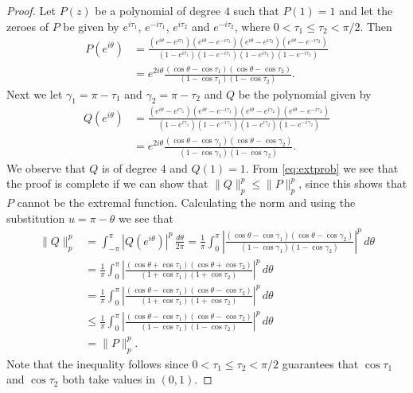 \documentclass{amsart}
\theoremstyle{plain}
\theoremstyle{remark}
\begin{document}
	\begin{proof}
	Let $P(z)$ be a polynomial of degree $4$ such that $P(1)=1$ and let the zeroes of $P$ be given by $e^{i \tau_1}$, $e^{-i \tau_1}$, $e^{i \tau_2}$ and $e^{-i \tau_2}$, where $0<\tau_1 \leq \tau_2 <\pi/2$. Then 
		\[\begin{split}
			P(e^{i \theta})&= \frac{(e^{i \theta}-e^{i \tau_1})(e^{i \theta}-e^{-i \tau_1})(e^{i \theta}-e^{i \tau_2})(e^{i \theta}-e^{-i \tau_2})}{(1-e^{i \tau_1})(1-e^{-i \tau_1})(1-e^{i \tau_2})(1-e^{-i \tau_2})}\\&=e^{2 i \theta} \frac{(\cos \theta-\cos \tau_1)(\cos \theta - \cos \tau_2)}{(1-\cos \tau_1)(1-\cos \tau_2)}.
		\end{split}
		\]
		Next we let $\gamma_1=\pi-\tau_1$ and $\gamma_2=\pi- \tau_2$ and $Q$ be the polynomial given by
		\[\begin{split}
			Q(e^{i \theta})&= \frac{(e^{i \theta}-e^{i \gamma_1})(e^{i \theta}-e^{-i \gamma_1})(e^{i \theta}-e^{i \gamma_2})(e^{i \theta}-e^{-i \gamma_2})}{(1-e^{i \gamma_1})(1-e^{-i \gamma_1})(1-e^{i \gamma_2})(1-e^{-i \gamma_2})}\\&=e^{2 i \theta} \frac{(\cos \theta-\cos \gamma_1)(\cos \theta - \cos \gamma_2)}{(1-\cos \gamma_1)(1-\cos \gamma_2)}.
		\end{split}
		\]
		We observe that $Q$ is of degree $4$ and $Q(1)=1$. From \eqref{eq:extprob} we see that the proof is complete  if we can show that $\|Q\|_p^p \leq \|P\|_p^p$, since this shows that $P$ cannot be the extremal function.
		Calculating the norm and using the substitution $u=\pi-\theta$ we see that
		\[\begin{split}
			\|Q\|_p^p&= \int_{-\pi}^{\pi} |Q(e^{i \theta})|^p\, \frac {d\theta}{2 \pi}=\frac{1}{\pi} \int_{0}^{\pi}\left|\frac{(\cos \theta-\cos \gamma_1)(\cos \theta - \cos \gamma_2)}{(1-\cos \gamma_1)(1-\cos \gamma_2)}\right|^p \, d\theta\\&=
			\frac{1}{\pi} \int_{0}^{\pi}\left|\frac{(\cos \theta+\cos \tau_1)(\cos \theta + \cos \tau_2)}{(1+\cos \tau_1)(1+\cos \tau_2)}\right|^p \, d\theta\\&=\frac{1}{\pi} \int_{0}^{\pi}\left|\frac{(\cos \theta-\cos \tau_1)(\cos \theta - \cos \tau_2)}{(1+\cos \tau_1)(1+\cos \tau_2)}\right|^p \, d\theta \\ &\leq 
			\frac{1}{\pi} \int_{0}^{\pi}\left|\frac{(\cos \theta-\cos \tau_1)(\cos \theta - \cos \tau_2)}{(1-\cos \tau_1)(1-\cos \tau_2)}\right|^p \, d\theta \\
			&=\|P\|_p^p.
		\end{split}\]
		Note that the inequality follows since $0 < \tau_1 \leq \tau_2 <\pi/2$ guarantees that $\cos \tau_1$ and $\cos \tau_2$ both take values in $(0,1)$.
	\end{proof}
	
\end{document}
